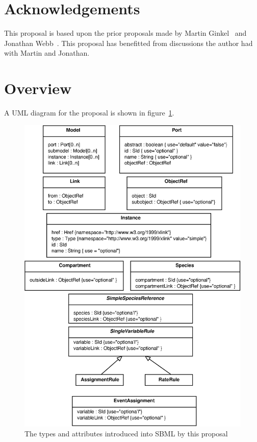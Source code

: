 \documentclass{cekarticle}
\begin{document}
\section{Acknowledgements}

This proposal is based upon the prior proposals made by Martin Ginkel~\citep{ginkel:2002} and Jonathan Webb~\citep{webb:2003}.
This proposal has benefitted from discussions the author had with Martin and Jonathan.

\section{Overview}

A UML diagram for the proposal is shown in figure~\ref{fig:model-composition-uml}.

\begin{figure}[h]
  \vspace*{8pt}
  \centering
  \includegraphics[scale = 0.7]{model-composition-uml}
  \caption{The types and attributes introduced into SBML by this proposal}
  \label{fig:model-composition-uml}
\end{figure}
\end{document}
